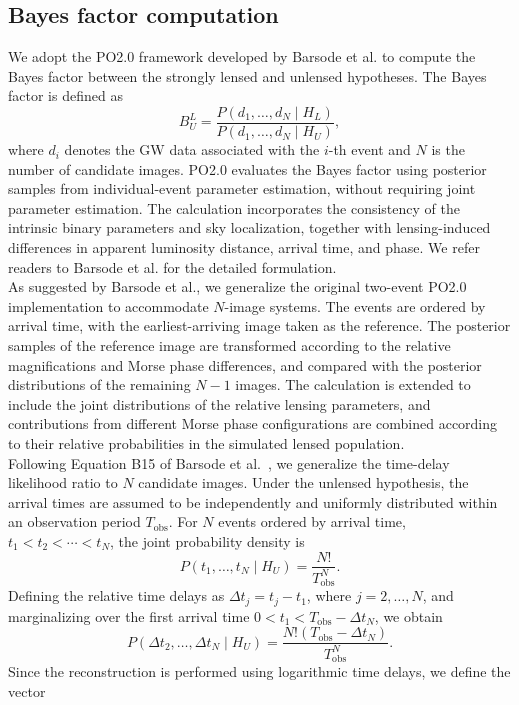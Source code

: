 \documentclass[pdflatex,sn-mathphys-num]{sn-jnl}%
\theoremstyle{thmstyleone}%
\theoremstyle{thmstyletwo}%
\theoremstyle{thmstylethree}%
\begin{document}
\subsection{Bayes factor computation}
We adopt the PO2.0 framework developed by Barsode et al. \cite{18} to compute the Bayes factor between 
the strongly lensed and unlensed hypotheses. The Bayes factor is defined as
\[
B_U^L = \frac{P(d_1,\ldots,d_N\mid H_L)}{P(d_1,\ldots,d_N\mid H_U)},
\]
where \(d_i\) denotes the GW data associated with the \(i\)-th event and \(N\) is the number of 
candidate images. PO2.0 evaluates the Bayes factor using posterior samples from individual-event 
parameter estimation, without requiring joint parameter estimation. The calculation incorporates 
the consistency of the intrinsic binary parameters and sky localization, together with lensing-induced 
differences in apparent luminosity distance, arrival time, and phase. We refer readers to Barsode 
et al. for the detailed formulation.\\
As suggested by Barsode et al., we generalize the original two-event PO2.0 implementation to accommodate 
\(N\)-image systems. The events are ordered by arrival time, with the earliest-arriving image taken 
as the reference. The posterior samples of the reference image are transformed according to the 
relative magnifications and Morse phase differences, and compared with the posterior distributions 
of the remaining \(N-1\) images. The calculation is extended to include the joint distributions of 
the relative lensing parameters, and contributions from different Morse phase configurations are 
combined according to their relative probabilities in the simulated lensed population.\\
Following Equation B15 of Barsode et al.~\cite{18}, we generalize the time-delay likelihood ratio to 
\(N\) candidate images. Under the unlensed hypothesis, the arrival times are assumed to be independently 
and uniformly distributed within an observation period \(T_{\mathrm{obs}}\). For \(N\) events ordered 
by arrival time, \(t_1<t_2<\cdots<t_N\), the joint probability density is
\[
P(t_1,\ldots,t_N\mid H_U)=\frac{N!}{T_{\mathrm{obs}}^N}.
\]
Defining the relative time delays as \(\Delta t_j=t_j-t_1\), where \(j=2,\ldots,N\), and marginalizing 
over the first arrival time \(0<t_1<T_{\mathrm{obs}}-\Delta t_N\), we obtain
\[
P(\Delta t_2,\ldots,\Delta t_N\mid H_U) = \frac{N!(T_{\mathrm{obs}}-\Delta t_N)}{T_{\mathrm{obs}}^N}.
\]
Since the reconstruction is performed using logarithmic time delays, we define the vector 
\end{document}
